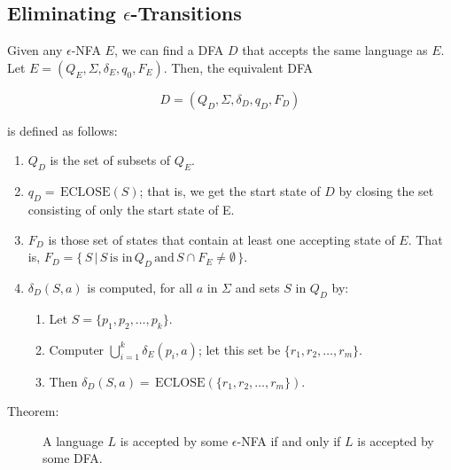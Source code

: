 \documentclass[]{article}
\begin{document}
  \subsection*{Eliminating $\epsilon$-Transitions}
    Given any $\epsilon$-NFA $E$, we can find a DFA $D$ that accepts the same 
    language as $E$. Let $E = (Q_E, \Sigma, \delta_E, q_0, F_E)$. Then, the 
    equivalent DFA
    
      \[ D = (Q_D, \Sigma, \delta_D, q_D, F_D) \]
    
    is defined as follows:
      \begin{enumerate}
        \item $Q_D$ is the set of subsets of $Q_E$. 
        \item $q_D = \, \text{ECLOSE}(S)$; that is, we get the start state of 
        $D$ by closing the set consisting of only the start state of E.
        \item $F_D$ is those set of states that contain at least one accepting 
        state of $E$. That is, $F_D = \{ \, S \, | \, S \, \text{is in} \, Q_D 
        \, \text{and} \, S \cap F_E \neq \emptyset \, \}$.
        \item $\delta_D(S,a)$ is computed, for all $a$ in $\Sigma$ and sets $S
        $ in $Q_D$ by:
          \begin{enumerate}
            \item Let $S = \{p_1, p_2, \ldots, p_k\}$.
            \item Computer $\bigcup^k_{i=1} \delta_E(p_i,a)$; let this set be 
            $\{r_1, r_2, \ldots, r_m\}$.
            \item Then $\delta_D(S,a) = \, \text{ECLOSE}(\{r_1,r_2,\ldots,r_m
            \})$.
          \end{enumerate}
      \end{enumerate}
      \begin{description}
        \item[Theorem:] A language $L$ is accepted by some $\epsilon$-NFA if 
        and only if $L$ is accepted by some DFA.
      \end{description}
      
\end{document}
